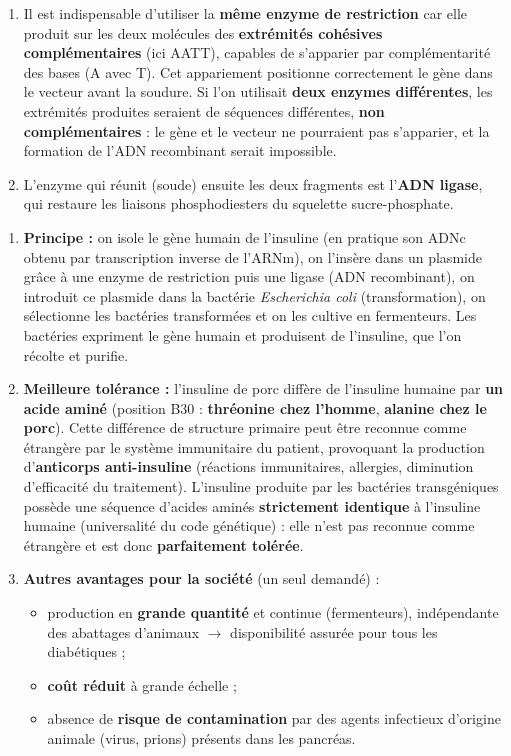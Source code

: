 \documentclass[11pt]{article}
\begin{document}
\begin{corrige}
\begin{enumerate}
\item Il est indispensable d'utiliser la \textbf{même enzyme de restriction} car elle produit sur les deux molécules des \textbf{extrémités cohésives complémentaires} (ici AATT), capables de s'apparier par complémentarité des bases (A avec T). Cet appariement positionne correctement le gène dans le vecteur avant la soudure. Si l'on utilisait \textbf{deux enzymes différentes}, les extrémités produites seraient de séquences différentes, \textbf{non complémentaires} : le gène et le vecteur ne pourraient pas s'apparier, et la formation de l'ADN recombinant serait impossible.
\item L'enzyme qui réunit (soude) ensuite les deux fragments est l'\textbf{ADN ligase}, qui restaure les liaisons phosphodiesters du squelette sucre-phosphate.
\end{enumerate}
\end{corrige}

\begin{corrige}
\begin{enumerate}
\item \textbf{Principe :} on isole le gène humain de l'insuline (en pratique son ADNc obtenu par transcription inverse de l'ARNm), on l'insère dans un plasmide grâce à une enzyme de restriction puis une ligase (ADN recombinant), on introduit ce plasmide dans la bactérie \emph{Escherichia coli} (transformation), on sélectionne les bactéries transformées et on les cultive en fermenteurs. Les bactéries expriment le gène humain et produisent de l'insuline, que l'on récolte et purifie.
\item \textbf{Meilleure tolérance :} l'insuline de porc diffère de l'insuline humaine par \textbf{un acide aminé} (position B30 : \textbf{thréonine chez l'homme}, \textbf{alanine chez le porc}). Cette différence de structure primaire peut être reconnue comme étrangère par le système immunitaire du patient, provoquant la production d'\textbf{anticorps anti-insuline} (réactions immunitaires, allergies, diminution d'efficacité du traitement). L'insuline produite par les bactéries transgéniques possède une séquence d'acides aminés \textbf{strictement identique} à l'insuline humaine (universalité du code génétique) : elle n'est pas reconnue comme étrangère et est donc \textbf{parfaitement tolérée}.
\item \textbf{Autres avantages pour la société} (un seul demandé) :
\begin{itemize}
\item production en \textbf{grande quantité} et continue (fermenteurs), indépendante des abattages d'animaux $\rightarrow$ disponibilité assurée pour tous les diabétiques ;
\item \textbf{coût réduit} à grande échelle ;
\item absence de \textbf{risque de contamination} par des agents infectieux d'origine animale (virus, prions) présents dans les pancréas.
\end{itemize}
\end{enumerate}
\end{corrige}
\end{document}
